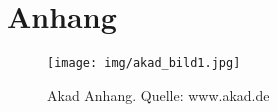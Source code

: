 \chapter{Anhang}

\begin{figure}[H]
\begin{center}
\texttt{[image: img/akad\_bild1.jpg]}
\caption[Akad Anhang]{Akad Anhang. Quelle: www.akad.de}
\end{center}
\end{figure}

%